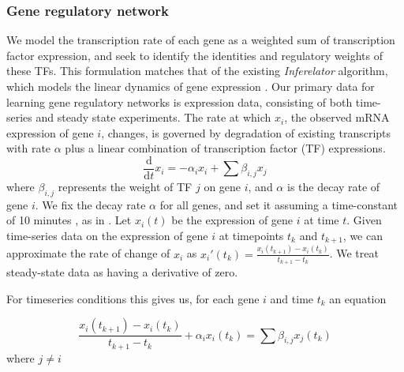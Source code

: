\documentclass[11pt]{article}
\begin{document}
\subsubsection{Gene regulatory network}

We model the transcription rate of each gene as a weighted sum of transcription factor expression, and seek to identify the identities and regulatory weights of these TFs. 
This formulation matches that of the existing \textit{Inferelator} algorithm, which models the linear dynamics of gene expression \cite{bonneau_inferelator:_2006-1}. Our primary data for learning gene regulatory networks is expression data, consisting of both time-series and steady state experiments. 
The rate at which $x_{i}$, the observed mRNA expression of gene $i$, changes, is governed by degradation of existing transcripts with rate $\alpha$ plus a linear combination of transcription factor (TF) expressions. 
\begin{equation}
\frac{\mathrm d}{\mathrm d t} x_i = -\alpha_{i}x_{i} + \sum \beta_{i,j}x_{j}
\end{equation}
where $\beta_{i,j}$ represents the weight of TF $j$ on gene $i$, and $\alpha$ is the decay rate of gene $i$. We fix the decay rate $\alpha$ for all genes, and set it assuming a time-constant of 10 minutes \cite{hambraeus_genome-wide_2003, selinger_global_2003}, as in \cite{greenfield_robust_2013}. Let $x_i(t)$ be the expression of gene $i$ at time $t$. 
Given time-series data on the expression of gene $i$ at timepoints $t_k$ and $t_{k+1}$, we can approximate the rate of change of $x_i$ as $x_i'(t_k)=\frac{x_i(t_{k+1})-x_i(t_k)}{t_{k+1}-t_k}$. 
We treat steady-state data as having a derivative of zero. 

For timeseries conditions this gives us, for each gene $i$ and time $t_{k}$ an equation

\begin{equation}
\frac{x_i(t_{k+1})-x_i(t_k)}{t_{k+1}-t_k} + \alpha_{i}x_{i}(t_k)= \sum \beta_{i,j}x_{j}(t_k)
\end{equation}
where $j \neq i$ 
\end{document}
